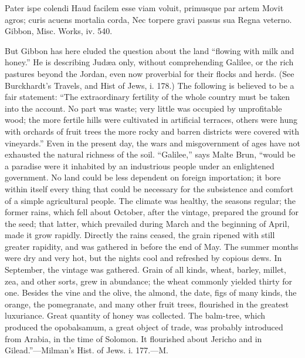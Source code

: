 {Pater ispe colendi Haud facilem esse viam voluit, primusque par
artem Movit agros; curis acuens mortalia corda, Nec torpere gravi
passus sua Regna veterno. Gibbon, Misc. Works, iv. 540.

But Gibbon has here eluded the question about the land “flowing
with milk and honey.” He is describing Judæa only, without
comprehending Galilee, or the rich pastures beyond the Jordan,
even now proverbial for their flocks and herds. (See Burckhardt’s
Travels, and Hist of Jews, i. 178.) The following is believed to
be a fair statement: “The extraordinary fertility of the whole
country must be taken into the account. No part was waste; very
little was occupied by unprofitable wood; the more fertile hills
were cultivated in artificial terraces, others were hung with
orchards of fruit trees the more rocky and barren districts were
covered with vineyards.” Even in the present day, the wars and
misgovernment of ages have not exhausted the natural richness of
the soil. “Galilee,” says Malte Brun, “would be a paradise were
it inhabited by an industrious people under an enlightened
government. No land could be less dependent on foreign
importation; it bore within itself every thing that could be
necessary for the subsistence and comfort of a simple
agricultural people. The climate was healthy, the seasons
regular; the former rains, which fell about October, after the
vintage, prepared the ground for the seed; that latter, which
prevailed during March and the beginning of April, made it grow
rapidly. Directly the rains ceased, the grain ripened with still
greater rapidity, and was gathered in before the end of May. The
summer months were dry and very hot, but the nights cool and
refreshed by copious dews. In September, the vintage was
gathered. Grain of all kinds, wheat, barley, millet, zea, and
other sorts, grew in abundance; the wheat commonly yielded thirty
for one. Besides the vine and the olive, the almond, the date,
figs of many kinds, the orange, the pomegranate, and many other
fruit trees, flourished in the greatest luxuriance. Great
quantity of honey was collected. The balm-tree, which produced
the opobalsamum, a great object of trade, was probably introduced
from Arabia, in the time of Solomon. It flourished about Jericho
and in Gilead.”—Milman’s Hist. of Jews. i. 177.—M.}


